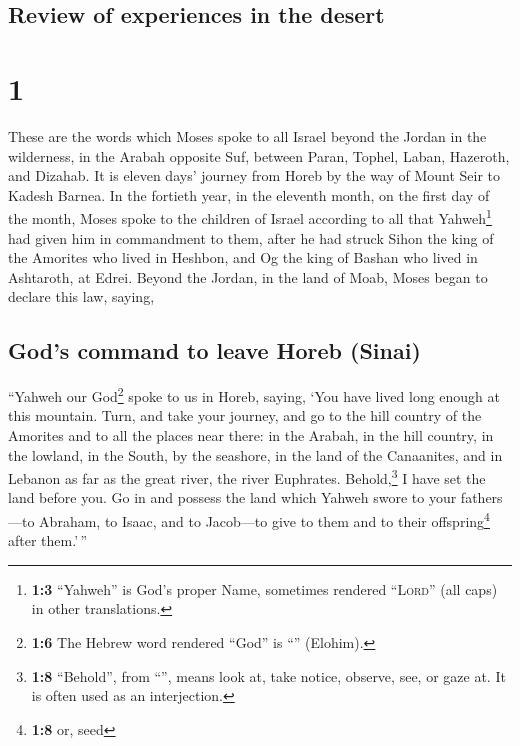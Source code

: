 \hypertarget{review-of-experiences-in-the-desert}{%
\subsection{Review of experiences in the
desert}\label{review-of-experiences-in-the-desert}}

\hypertarget{section}{%
\section{1}\label{section}}

 These are the words which Moses spoke to all Israel
beyond the Jordan in the wilderness, in the Arabah opposite Suf, between
Paran, Tophel, Laban, Hazeroth, and Dizahab.  It is eleven
days' journey from Horeb by the way of Mount Seir to Kadesh Barnea.
 In the fortieth year, in the eleventh month, on the first
day of the month, Moses spoke to the children of Israel according to all
that Yahweh\footnote{\textbf{1:3} ``Yahweh'' is God's proper Name,
  sometimes rendered ``\textsc{Lord}'' (all caps) in other translations.}
had given him in commandment to them,  after he had struck
Sihon the king of the Amorites who lived in Heshbon, and Og the king of
Bashan who lived in Ashtaroth, at Edrei.  Beyond the
Jordan, in the land of Moab, Moses began to declare this law, saying,

\hypertarget{gods-command-to-leave-horeb-sinai}{%
\subsection{God's command to leave Horeb
(Sinai)}\label{gods-command-to-leave-horeb-sinai}}

 ``Yahweh our God\footnote{\textbf{1:6} The Hebrew word
  rendered ``God'' is ``'' (Elohim).} spoke to us in
Horeb, saying, `You have lived long enough at this mountain.
 Turn, and take your journey, and go to the hill country
of the Amorites and to all the places near there: in the Arabah, in the
hill country, in the lowland, in the South, by the seashore, in the land
of the Canaanites, and in Lebanon as far as the great river, the river
Euphrates.  Behold,\footnote{\textbf{1:8} ``Behold'', from
  ``'', means look at, take notice, observe, see, or gaze
  at. It is often used as an interjection.} I have set the land before
you. Go in and possess the land which Yahweh swore to your fathers---to
Abraham, to Isaac, and to Jacob---to give to them and to their
offspring\footnote{\textbf{1:8} or, seed} after them.'\,''


